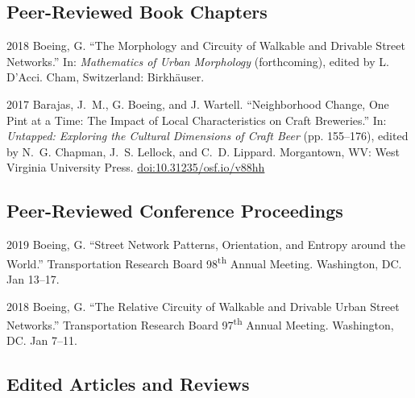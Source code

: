 \documentclass[12pt,letterpaper]{report}
\begin{document}
	
	
	\subsection*{Peer-Reviewed Book Chapters}
	
	\begin{tablist}
		
		\item[2018] \tab Boeing, G. \enquote{The Morphology and Circuity of Walkable and Drivable Street Networks.} In: \textit{Mathematics of Urban Morphology} (forthcoming), edited by L. D'Acci. Cham, Switzerland: Birkhäuser.
		
		\item[2017] \tab Barajas, J.~M., G. Boeing, and J. Wartell. \enquote{Neighborhood Change, One Pint at a Time: The Impact of Local Characteristics on Craft Breweries.} In: \textit{Untapped: Exploring the Cultural Dimensions of Craft Beer} (pp. 155--176), edited by N.~G. Chapman, J.~S. Lellock, and C.~D. Lippard. Morgantown, WV: West Virginia University Press. \href{https://doi.org/10.31235/osf.io/v88hh}{doi:10.31235/osf.io/v88hh}
		
	\end{tablist}
	
	
	
	\subsection*{Peer-Reviewed Conference Proceedings}
	
	\begin{tablist}
		
		\item[2019] \tab Boeing, G. \enquote{Street Network Patterns, Orientation, and Entropy around the World.} Transportation Research Board 98\textsuperscript{th} Annual Meeting. Washington, DC. Jan 13--17.
		
		\item[2018] \tab Boeing, G. \enquote{The Relative Circuity of Walkable and Drivable Urban Street Networks.} Transportation Research Board 97\textsuperscript{th} Annual Meeting. Washington, DC. Jan 7--11.
		
	\end{tablist}
	
	
	
	\subsection*{Edited Articles and Reviews}
	
\end{document}
